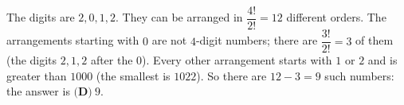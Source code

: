 The digits are $2,0,1,2$. They can be arranged in $\dfrac{4!}{2!}=12$ different orders. The arrangements starting with $0$ are not $4$-digit numbers; there are $\dfrac{3!}{2!}=3$ of them (the digits $2,1,2$ after the $0$). Every other arrangement starts with $1$ or $2$ and is greater than $1000$ (the smallest is $1022$). So there are $12-3=9$ such numbers: the answer is $\boxed{\textbf{(D)}\ 9}$.
